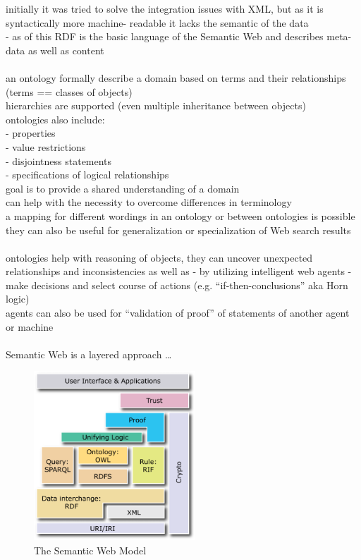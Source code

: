 initially it was tried to solve the integration issues with XML, but as it is syntactically more machine-
readable it lacks the semantic of the data \\
- as of this RDF is the basic language of the Semantic Web and describes meta-data as well as content \\
\\
an ontology formally describe a domain based on terms and their relationships (terms == classes of objects) \\
hierarchies are supported (even multiple inheritance between objects) \\
ontologies also include: \\
- properties \\
- value restrictions \\
- disjointness statements \\
- specifications of logical relationships \\
goal is to provide a shared understanding of a domain \\
can help with the necessity to overcome differences in terminology \\
a mapping for different wordings in an ontology or between ontologies is possible \\
they can also be useful for generalization or specialization of Web search results \\
\\
ontologies help with reasoning of objects, they can uncover unexpected relationships and
inconsistencies as well as - by utilizing intelligent web agents - make decisions and select course of actions
(e.g. ``if-then-conclusions'' aka Horn logic) \\
agents can also be used for ``validation of proof'' of statements of another agent or machine \\
\\
Semantic Web is a layered approach \ldots

\begin{figure}[H]
	\centering
		\includegraphics[height=2.5in]{images/semantic_web_layers.png}
	\caption{The Semantic Web Model \citep{W3C2013}}
\label{fig:images_semweb_model}
\end{figure}

